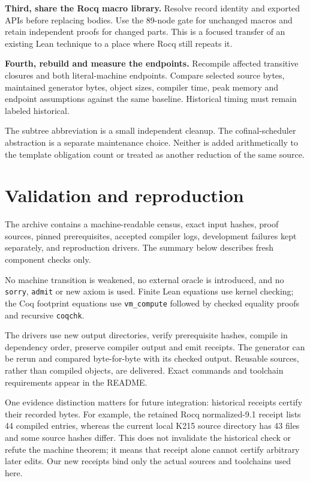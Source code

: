\textbf{Third, share the Rocq macro library.} Resolve record identity and exported APIs before replacing bodies. Use the 89-node gate for unchanged macros and retain independent proofs for changed parts. This is a focused transfer of an existing Lean technique to a place where Rocq still repeats it.

\textbf{Fourth, rebuild and measure the endpoints.} Recompile affected transitive closures and both literal-machine endpoints. Compare selected source bytes, maintained generator bytes, object sizes, compiler time, peak memory and endpoint assumptions against the same baseline. Historical timing must remain labeled historical.

The subtree abbreviation is a small independent cleanup. The cofinal-scheduler abstraction is a separate maintenance choice. Neither is added arithmetically to the template obligation count or treated as another reduction of the same source.

\section{Validation and reproduction}
The archive contains a machine-readable census, exact input hashes, proof sources, pinned prerequisites, accepted compiler logs, development failures kept separately, and reproduction drivers. The summary below describes fresh component checks only.



No machine transition is weakened, no external oracle is introduced, and no \texttt{sorry}, \texttt{admit} or new axiom is used. Finite Lean equations use kernel checking; the Coq footprint equations use \texttt{vm\_compute} followed by checked equality proofs and recursive \texttt{coqchk}.

The drivers use new output directories, verify prerequisite hashes, compile in dependency order, preserve compiler output and emit receipts. The generator can be rerun and compared byte-for-byte with its checked output. Reusable sources, rather than compiled objects, are delivered. Exact commands and toolchain requirements appear in the README.

One evidence distinction matters for future integration: historical receipts certify their recorded bytes. For example, the retained Rocq normalized-9.1 receipt lists 44 compiled entries, whereas the current local K215 source directory has 43 files and some source hashes differ. This does not invalidate the historical check or refute the machine theorem; it means that receipt alone cannot certify arbitrary later edits. Our new receipts bind only the actual sources and toolchains used here.

